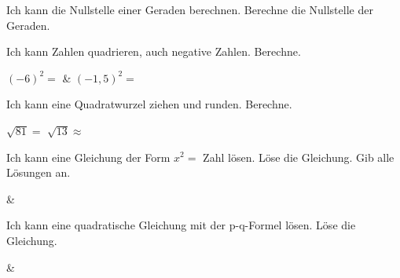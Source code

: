 \setcounter{aufgabe}{0}

\begin{aufgabe}{Ich kann die Nullstelle einer Geraden berechnen.}
Berechne die Nullstelle der Geraden.
\end{aufgabe}

\begin{aufgabe}{Ich kann Zahlen quadrieren, auch negative Zahlen.}
Berechne.
\begin{teilezwei}
\tz $(-6)^2 = $ \leerfeld & \tz $(-1{,}5)^2 = $ \leerfeld \\
\end{teilezwei}
\end{aufgabe}

\begin{aufgabe}{Ich kann eine Quadratwurzel ziehen und runden.}
Berechne.
\begin{teile}
\teil $\sqrt{81} = $ \leerfeld
{}
\teil $\sqrt{13} \approx $ \leerfeld
\end{teile}
\end{aufgabe}

\begin{aufgabe}{Ich kann eine Gleichung der Form $x^2 = $ Zahl lösen.}
Löse die Gleichung. Gib alle Lösungen an.
\begin{gleichungsraster}[2]
 &  \\
\end{gleichungsraster}
\end{aufgabe}

\begin{aufgabe}{Ich kann eine quadratische Gleichung mit der p-q-Formel lösen.}
Löse die Gleichung.
\begin{gleichungsraster}[4]
 &  \\
\end{gleichungsraster}
\end{aufgabe}
